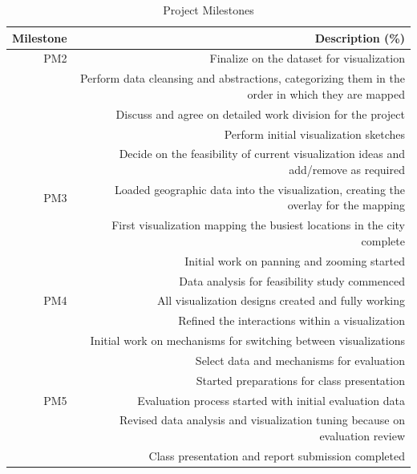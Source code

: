 \begin{table}[h]
 \caption{Project Milestones}\vspace{1ex} %
 \label{tab:milestones}
 \scriptsize
 \centering %
   \begin{tabular}{r|r}
     Milestone & Description (\%)\\
   \hline
     PM2 & Finalize on the dataset for visualization\\
     	 & Perform data cleansing and abstractions, categorizing them in the order in which they are mapped\\
         & Discuss and agree on detailed work division for the project\\
         & Perform initial visualization sketches\\
         & Decide on the feasibility of current visualization ideas and add/remove as required\\
     PM3 & Loaded geographic data into the visualization, creating the overlay for the mapping\\
         & First visualization mapping the busiest locations in the city complete\\
         & Initial work on panning and zooming started\\
         & Data analysis for feasibility study commenced\\
     PM4 & All visualization designs created and fully working\\
	 & Refined the interactions within a visualization\\
	 & Initial work on mechanisms for switching between visualizations\\
	 & Select data and mechanisms for evaluation\\
	 & Started preparations for class presentation\\
     PM5 & Evaluation process started with initial evaluation data\\
         & Revised data analysis and visualization tuning because on evaluation review\\
         & Class presentation and report submission completed\\
   \end{tabular}
\end{table}

